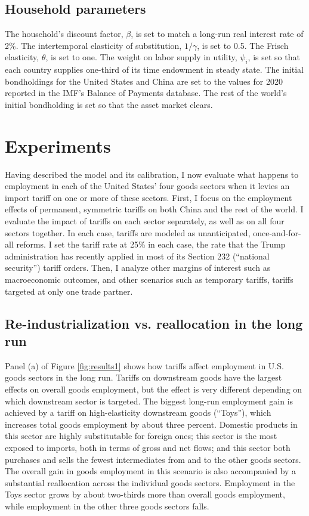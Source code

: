 \documentclass[12pt]{article}
\begin{document}
\subsection{Household parameters}
The household's discount factor, $\beta$, is set to match a long-run real interest rate of 2\%. The intertemporal elasticity of substitution, $1/\gamma$, is set to 0.5. The Frisch elasticity, $\theta$, is set to one. The weight on labor supply in utility, $\psi_i$, is set so that each country supplies one-third of its time endowment in steady state. The initial bondholdings for the United States and China are set to the values for 2020 reported in the IMF's Balance of Payments database. The rest of the world's initial bondholding is set so that the asset market clears.

\section{Experiments}
Having described the model and its calibration, I now evaluate what happens to employment in each of the United States' four goods sectors when it levies an import tariff on one or more of these sectors. First, I focus on the employment effects of permanent, symmetric tariffs on both China and the rest of the world. I evaluate the impact of tariffs on each sector separately, as well as on all four sectors together. In each case, tariffs are modeled as unanticipated, once-and-for-all reforms. I set the tariff rate at 25\% in each case, the rate that the Trump administration has recently applied in most of its Section 232 (``national security'') tariff orders. Then, I analyze other margins of interest such as macroeconomic outcomes, and other scenarios such as temporary tariffs, tariffs targeted at only one trade partner.

\subsection{Re-industrialization vs. reallocation in the long run}
Panel (a) of Figure \ref{fig:results1} shows how tariffs affect employment in U.S. goods sectors in the long run. Tariffs on downstream goods have the largest effects on overall goods employment, but the effect is very different depending on which downstream sector is targeted. The biggest long-run employment gain is achieved by a tariff on high-elasticity downstream goods (``Toys''), which increases total goods employment by about three percent. Domestic products in this sector are highly substitutable for foreign ones; this sector is the most exposed to imports, both in terms of gross and net flows; and this sector both purchases and sells the fewest intermediates from and to the other goods sectors. The overall gain in goods employment in this scenario is also accompanied by a substantial reallocation across the individual goods sectors. Employment in the Toys sector grows by about two-thirds more than overall goods employment, while employment in the other three goods sectors falls.
\end{document}
